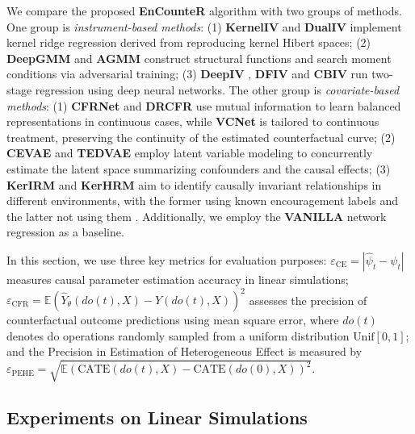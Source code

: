 \documentclass[journal]{IEEEtran}
\begin{document}
We compare the proposed \textbf{EnCounteR} algorithm with two groups of methods. One group is \emph{instrument-based methods}: (1) 
\textbf{KernelIV} \cite{singh2019kernel} and \textbf{DualIV} \cite{muandet2020dual}  implement kernel ridge regression derived from reproducing kernel Hibert spaces; (2) \textbf{DeepGMM} \cite{2019deepgmm} and \textbf{AGMM} \cite{lewis2020agmm} construct structural functions and search moment conditions via adversarial training; (3) \textbf{DeepIV} \cite{hartford2017deep}, \textbf{DFIV} \cite{xu2020dfiv} and \textbf{CBIV} \cite{wu2022instrumental} run two-stage regression using deep neural networks. The other group is \emph{covariate-based methods}: (1) \textbf{CFRNet} \cite{shalit2017estimating} and \textbf{DRCFR} \cite{hassanpour2020learning} use mutual information to learn balanced representations in continuous cases, while \textbf{VCNet} \cite{nie2021vcnet} is tailored to continuous treatment, preserving the continuity of the estimated counterfactual curve; (2) \textbf{CEVAE} \cite{louizos2017causal} and \textbf{TEDVAE} \cite{zhang2021treatment} employ latent variable modeling to concurrently estimate the latent space summarizing confounders and the causal effects; (3) \textbf{KerIRM} and \textbf{KerHRM} aim to identify causally invariant relationships in different environments, with the former using known encouragement labels and the latter not using them \cite{arjovsky2019invariant,liu2021heterogeneous,liu2021kernelized}. 
Additionally, we employ the \textbf{VANILLA} network regression as a baseline. 

In this section, we use three key metrics for evaluation purposes: $\varepsilon_{\text{CE}} = |\hat{\psi}_t-\psi_t |$ measures causal parameter estimation accuracy in linear simulations; $\varepsilon_{\text{CFR}} = \mathbb{E}(\hat{Y}_\theta(do(t),X)-Y(do(t),X) )^2$ assesses the precision of counterfactual outcome predictions using mean square error, where $do(t)$ denotes do operations randomly sampled from a uniform distribution $\text{Unif}[0, 1]$; and the Precision in Estimation of Heterogeneous Effect is measured by $\varepsilon_{\text{PEHE}} = \sqrt{
\mathbb{E}(\text{CATE}(do(t),X) - \text{CATE}(do(0),X))^2
}$. 


\subsection{Experiments on Linear Simulations}
\label{sec:lineara}
\end{document}
